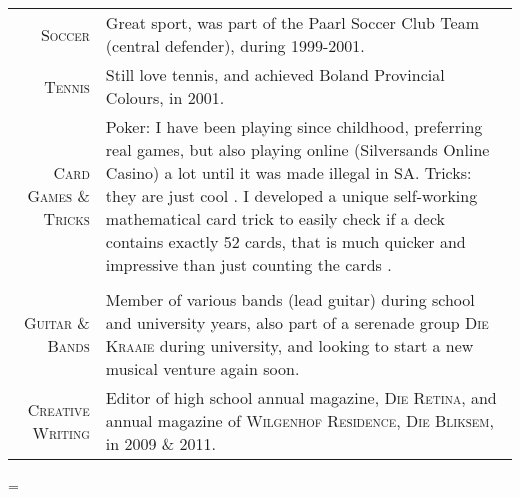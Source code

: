 \documentclass[a4paper,10pt,notitlepage]{article}
\newenvironment{absolutelynopagebreak}
  {\par\nobreak\vfil\penalty0\vfilneg
   \vtop\bgroup}
  {\par\xdef\tpd{\the\prevdepth}\egroup
   \prevdepth=\tpd}
\begin{document}
\begin{absolutelynopagebreak}
\begin{tabular}{r|p{11cm}}
 \textsc{Soccer} & Great sport, was part of the Paarl Soccer Club Team (central defender), during 1999-2001. \\
 \textsc{Tennis} & Still love tennis, and achieved Boland Provincial Colours, in 2001. \\
 \textsc{Card Games \& Tricks} & Poker: I have been playing since childhood, preferring real games, but also playing online (Silversands Online Casino) a lot until it was made illegal in SA. Tricks: they are just cool \smiley{}. I developed a unique self-working mathematical card trick to easily check if a deck contains exactly 52 cards, that is much quicker and impressive than just counting the cards \smiley{}.\\
 
 \multicolumn{2}{c}{}\\
 
 \textsc{Guitar \& Bands} & Member of various bands (lead guitar) during school and university years, also part of a serenade group \textsc{Die Kraaie} during university, and looking to start a new musical venture again soon. \\
 \textsc{Creative Writing} & Editor of high school annual magazine, \textsc{Die Retina}, and annual magazine of \textsc{Wilgenhof Residence}, \textsc{Die Bliksem}, in 2009 \& 2011. \\
 
\end{tabular}



\end{absolutelynopagebreak}
\end{document}
